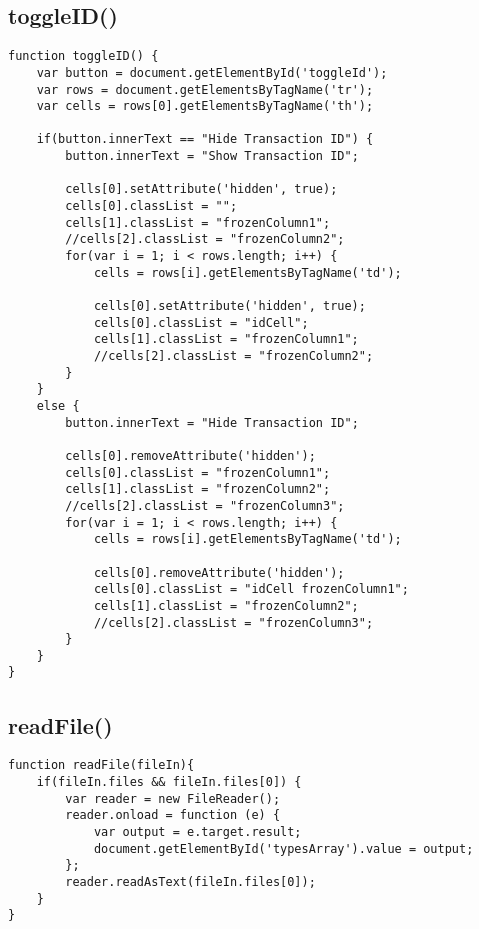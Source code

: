 \documentclass[letterpaper]{article}
\begin{document}
\subsection{toggleID()}

\begin{lstlisting}[firstnumber=605]
function toggleID() {
    var button = document.getElementById('toggleId');
    var rows = document.getElementsByTagName('tr');
    var cells = rows[0].getElementsByTagName('th');

    if(button.innerText == "Hide Transaction ID") {
        button.innerText = "Show Transaction ID";

        cells[0].setAttribute('hidden', true);
        cells[0].classList = "";
        cells[1].classList = "frozenColumn1";
        //cells[2].classList = "frozenColumn2";
        for(var i = 1; i < rows.length; i++) {
            cells = rows[i].getElementsByTagName('td');

            cells[0].setAttribute('hidden', true);
            cells[0].classList = "idCell";
            cells[1].classList = "frozenColumn1";
            //cells[2].classList = "frozenColumn2";
        }
    }
    else {
        button.innerText = "Hide Transaction ID";

        cells[0].removeAttribute('hidden');
        cells[0].classList = "frozenColumn1";
        cells[1].classList = "frozenColumn2";
        //cells[2].classList = "frozenColumn3";
        for(var i = 1; i < rows.length; i++) {
            cells = rows[i].getElementsByTagName('td');

            cells[0].removeAttribute('hidden');
            cells[0].classList = "idCell frozenColumn1";
            cells[1].classList = "frozenColumn2";
            //cells[2].classList = "frozenColumn3";
        }
    }
}
\end{lstlisting}

\subsection{readFile()}

\begin{lstlisting}[firstnumber=644]
function readFile(fileIn){
    if(fileIn.files && fileIn.files[0]) {
        var reader = new FileReader();
        reader.onload = function (e) {
            var output = e.target.result;
            document.getElementById('typesArray').value = output;
        };
        reader.readAsText(fileIn.files[0]);
    }
}
\end{lstlisting}
\end{document}
